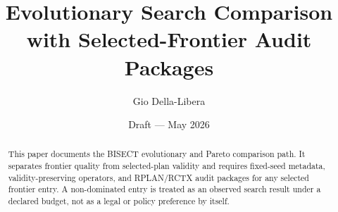 \documentclass[12pt]{article}
\title{Evolutionary Search Comparison with Selected-Frontier Audit Packages}
\author{Gio Della-Libera}
\date{Draft --- May 2026}
\begin{document}
\maketitle

\begin{abstract}
This paper documents the BISECT evolutionary and Pareto comparison path. It
separates frontier quality from selected-plan validity and requires fixed-seed
metadata, validity-preserving operators, and RPLAN/RCTX audit packages for any
selected frontier entry. A non-dominated entry is treated as an observed search
result under a declared budget, not as a legal or policy preference by itself.
\end{abstract}








\nocite{bisect-u19-plan}


\end{document}

